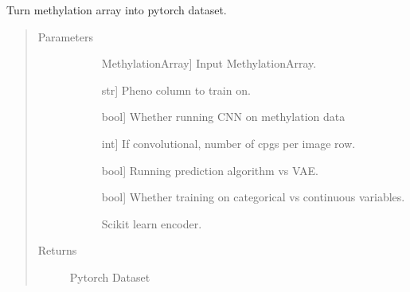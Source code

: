 \documentclass[letterpaper,10pt,english]{sphinxmanual}
\begin{document}
\begin{fulllineitems}
\end{fulllineitems}


\begin{fulllineitems}
\label{\detokenize{index:methylnet.datasets.get_methylation_dataset}}
Turn methylation array into pytorch dataset.
\begin{quote}\begin{description}
\item[{Parameters}] \leavevmode\begin{description}
\item[{}] \leavevmode{[}MethylationArray{]}
Input MethylationArray.

\item[{}] \leavevmode{[}str{]}
Pheno column to train on.

\item[{}] \leavevmode{[}bool{]}
Whether running CNN on methylation data

\item[{}] \leavevmode{[}int{]}
If convolutional, number of cpgs per image row.

\item[{}] \leavevmode{[}bool{]}
Running prediction algorithm vs VAE.

\item[{}] \leavevmode{[}bool{]}
Whether training on categorical vs continuous variables.

\item[{}] \leavevmode
Scikit learn encoder.

\end{description}

\item[{Returns}] \leavevmode\begin{description}
\item[{Pytorch Dataset}] \leavevmode
\end{description}

\end{description}\end{quote}

\end{fulllineitems}
\end{document}
